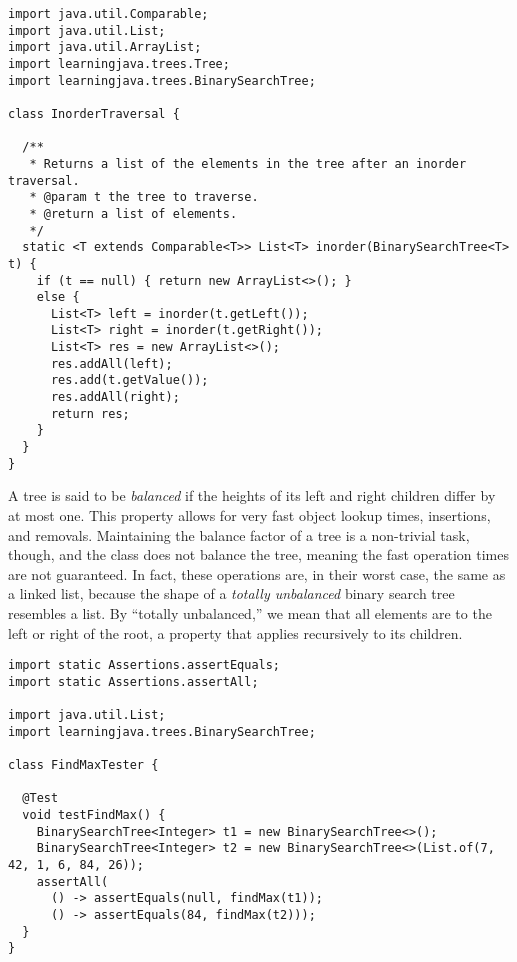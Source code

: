 \enlargethispage{1\baselineskip}
\begin{lstlisting}[language=MyJava]
import java.util.Comparable;
import java.util.List;
import java.util.ArrayList;
import learningjava.trees.Tree;
import learningjava.trees.BinarySearchTree;

class InorderTraversal {

  /**
   * Returns a list of the elements in the tree after an inorder traversal.
   * @param t the tree to traverse.
   * @return a list of elements.
   */
  static <T extends Comparable<T>> List<T> inorder(BinarySearchTree<T> t) {
    if (t == null) { return new ArrayList<>(); } 
    else {
      List<T> left = inorder(t.getLeft());
      List<T> right = inorder(t.getRight());
      List<T> res = new ArrayList<>();
      res.addAll(left);
      res.add(t.getValue());
      res.addAll(right);
      return res;
    }
  }
}
\end{lstlisting}

A tree is said to be \emph{balanced} if the heights of its left and right children differ by at most one.
This property allows for very fast object lookup times, insertions, and removals. 
Maintaining the balance factor of a tree is a non-trivial task, though, and the  class does not balance the tree, meaning the fast operation times are not guaranteed.
In fact, these operations are, in their worst case, the same as a linked list, because the shape of a \emph{totally unbalanced} binary search tree resembles a list. 
By ``totally unbalanced,'' we mean that all elements are to the left or right of the root, a property that applies recursively to its children.


\begin{lstlisting}[language=MyJava]
import static Assertions.assertEquals;
import static Assertions.assertAll;

import java.util.List;
import learningjava.trees.BinarySearchTree;

class FindMaxTester {

  @Test
  void testFindMax() {
    BinarySearchTree<Integer> t1 = new BinarySearchTree<>();
    BinarySearchTree<Integer> t2 = new BinarySearchTree<>(List.of(7, 42, 1, 6, 84, 26));
    assertAll(
      () -> assertEquals(null, findMax(t1));
      () -> assertEquals(84, findMax(t2)));
  }
}
\end{lstlisting}

